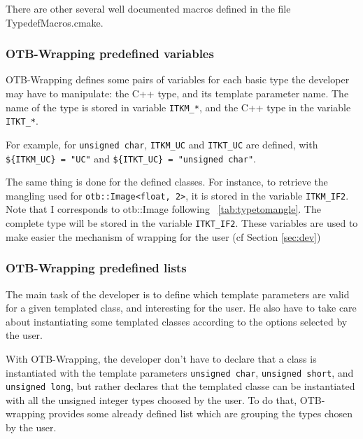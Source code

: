 There are other several well documented macros defined in the file TypedefMacros.cmake.


\subsubsection{OTB-Wrapping predefined variables}
OTB-Wrapping defines some pairs of variables for each basic type the developer may have
to manipulate: the C++ type, and its template parameter name. The name of the type
is stored in variable \verb$ITKM_*$, and the C++ type in the variable \verb$ITKT_*$.

For example, for \verb$unsigned char$, \verb$ITKM_UC$ and \verb$ITKT_UC$
are defined, with \verb|${ITKM_UC} = "UC"|  and \verb|${ITKT_UC} = "unsigned char"|.

The same thing is done for the defined classes. 
For instance, to retrieve the mangling used for  \verb|otb::Image<float, 2>|, 
it is stored in the variable  \verb|ITKM_IF2|.
Note that I corresponds to otb::Image following ~\ref{tab:typetomangle}.
The complete type will be stored in the variable \verb?ITKT_IF2?. 
These variables are used to make easier the mechanism of 
wrapping for the user (cf Section \ref{sec:dev})

 \subsubsection{OTB-Wrapping predefined lists}
The main task of the developer is to define which template parameters are valid for a given
templated class, and interesting for the user. He also have to take care about
instantiating some templated classes according to the options selected by the user.


With OTB-Wrapping, the developer don't have to declare that a class is instantiated with the template parameters
\verb$unsigned char$, \verb$unsigned short$, and \verb$unsigned long$, but rather declares that the
templated classe can be instantiated with all the unsigned integer types choosed by the user.
To do that, OTB-wrapping provides some already defined list which are grouping the types chosen by
the user.

